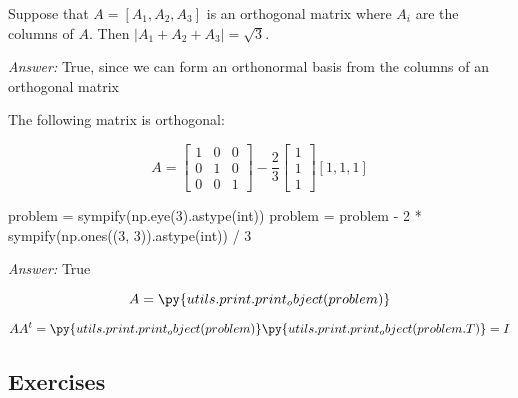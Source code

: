 \documentclass[letterpaper]{article}
\newcommand{\ans}{\textit{Answer: }}
\newenvironment{question}[2][Question]{\begin{trivlist}
\item[\hskip \labelsep {\bfseries #1}\hskip \labelsep {\bfseries #2.}]}{\end{trivlist}}
\newcommand{\printobj}[1]{\py{utils.print.print_object(#1)}}
\begin{document}
\begin{question}{6.20}
  Suppose that $A=\left[A_{1}, A_{2}, A_{3}\right]$ is an orthogonal matrix where $A_{i}$ are the columns
  of $A .$ Then $\left|A_{1}+A_{2}+A_3 \right|=\sqrt{3} .$

  \ans True, since we can form an orthonormal basis from the columns of an orthogonal matrix
\end{question}

\begin{question}{6.22}
  The following matrix is orthogonal:

  $$
  A=\left[ \begin{array}{lll}{1} & {0} & {0} \\ {0} & {1} & {0} \\ {0} & {0} & {1}\end{array}\right]-\frac{2}{3} \left[ \begin{array}{l}{1} \\ {1} \\ {1}\end{array}\right][1,1,1]
  $$

  \begin{pycode}
problem = sympify(np.eye(3).astype(int)) 
problem = problem - 2 * sympify(np.ones((3, 3)).astype(int)) / 3
  \end{pycode}

  \ans True

  $$A = \printobj{problem}$$

  $$AA^t = \printobj{problem} \printobj{problem.T} 
  = I$$
\end{question}

\subsection{Exercises}
\end{document}
